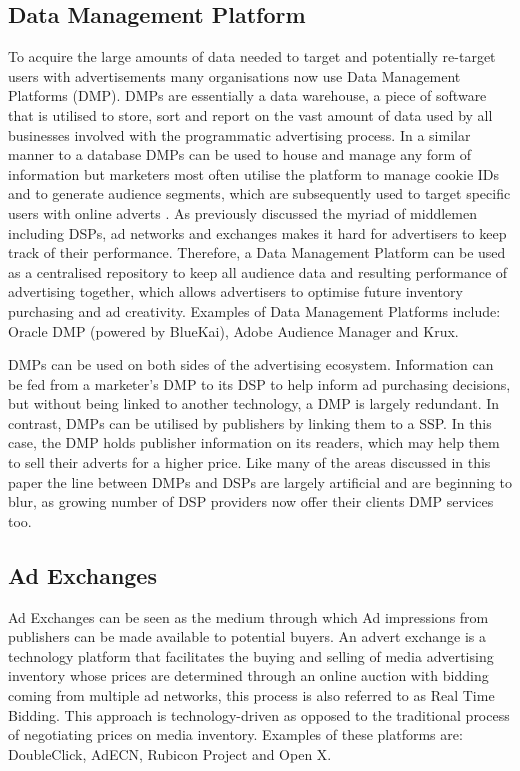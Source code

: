 \documentclass[12pt]{article}
\begin{document}
\subsection{Data Management Platform}
To acquire the large amounts of data needed to target and potentially re-target users with advertisements many organisations now use Data Management Platforms (DMP). DMPs are essentially a data warehouse, a piece of software that is utilised to store, sort and report on the vast amount of data used by all businesses involved with the programmatic advertising process. In a similar manner to a database DMPs can be used to house and manage any form of information but marketers most often utilise the platform to manage cookie IDs and to generate audience segments, which are subsequently used to target specific users with online adverts \parencite{DMP}. As previously discussed the myriad of middlemen including DSPs, ad networks and exchanges makes it hard for advertisers to keep track of their performance. Therefore, a Data Management Platform can be used as a centralised repository to keep all audience data and resulting performance of advertising together, which allows advertisers to optimise future inventory purchasing and ad creativity. Examples of Data Management Platforms include: Oracle DMP (powered by BlueKai), Adobe Audience Manager and Krux. \newline

DMPs can be used on both sides of the advertising ecosystem. Information can be fed from a marketer's DMP to its DSP to help inform ad purchasing decisions, but without being linked to another technology, a DMP is largely redundant. In contrast, DMPs can be 
utilised by publishers by linking them to a SSP. In this case, the DMP holds publisher information on its readers, which may help them to sell their adverts for a higher price. Like many of the areas discussed in this paper the line between DMPs and DSPs are largely artificial and are beginning to blur, as growing number of DSP providers now offer their clients DMP services too.  

\subsection{Ad Exchanges} \label{AdExchanges}
Ad Exchanges can be seen as the medium through which Ad impressions from publishers can be made available to potential buyers. An advert exchange is a technology platform that facilitates the buying and selling of media advertising inventory whose prices are determined through an online auction with bidding coming from multiple ad networks, this process is also referred to as Real Time Bidding. This approach is technology-driven as opposed to the traditional process of negotiating prices on media inventory. Examples of these platforms are: DoubleClick, AdECN, Rubicon Project and Open X. \newline
\end{document}
